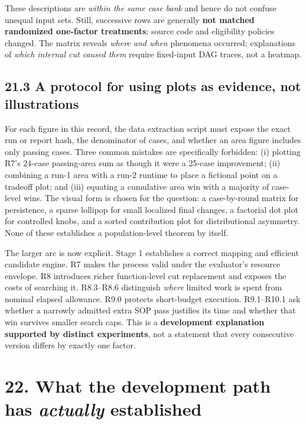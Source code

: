 These descriptions are \emph{within the same case bank} and hence do not confuse unequal input sets. Still, successive rows are generally \textbf{not matched randomized one-factor treatments}: source code and eligibility policies changed. The matrix reveals \emph{where and when} phenomena occurred; explanations of \emph{which internal cut caused them} require fixed-input DAG traces, not a heatmap.

\subsection{21.3 A protocol for using plots as evidence, not illustrations}\label{a-protocol-for-using-plots-as-evidence-not-illustrations}

For each figure in this record, the data extraction script must expose the exact run or report hash, the denominator of cases, and whether an area figure includes only passing cases. Three common mistakes are specifically forbidden: (i) plotting R7's 24-case passing-area sum as though it were a 25-case improvement; (ii) combining a run-1 area with a run-2 runtime to place a fictional point on a tradeoff plot; and (iii) equating a cumulative area win with a majority of case-level wins. The visual form is chosen for the question: a case-by-round matrix for persistence, a sparse lollipop for small localized final changes, a factorial dot plot for controlled knobs, and a sorted contribution plot for distributional asymmetry. None of these establishes a population-level theorem by itself.

The larger arc is now explicit. Stage 1 establishes a correct mapping and efficient candidate engine. R7 makes the process valid under the evaluator's resource envelope. R8 introduces richer function-level cut replacement and exposes the costs of searching it. R8.3--R8.6 distinguish \emph{where} limited work is spent from nominal elapsed allowance. R9.0 protects short-budget execution. R9.1--R10.1 ask whether a narrowly admitted extra SOP pass justifies its time and whether that win survives smaller search caps. This is a \textbf{development explanation supported by distinct experiments}, not a statement that every consecutive version differs by exactly one factor.

\section{\texorpdfstring{22. What the development path has \emph{actually} established}{22. What the development path has actually established}}\label{what-the-development-path-has-actually-established}

